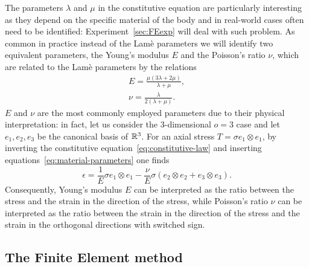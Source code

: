 The parameters $\lambda$ and $\mu$ in the constitutive equation are particularly interesting as they depend on the specific material of the body and in real-world cases often need to be identified: Experiment~\ref{sec:FEexp} will deal with such problem.
As common in practice instead of the Lamè parameters we will identify two equivalent parameters, the Young's modulus $E$ and the Poisson's ratio $\nu$, which are related to the Lamè parameters by the relations
\begin{equation}\label{eq:material-parameters}
    \begin{gathered}
        E = \frac{\mu(3\lambda + 2\mu)}{\lambda + \mu}, \\
        \nu = \frac{\lambda}{2(\lambda + \mu)}.
    \end{gathered}
\end{equation}
$E$ and $\nu$ are the most commonly employed parameters due to their physical interpretation: in fact, let us consider the 3-dimensional $o=3$ case and let $e_1,e_2,e_3$ be the canonical basis of $\mathbb{R}^3$.
For an axial stress $T = \sigma e_1 \otimes e_1$, by inverting the constitutive equation~\eqref{eq:constitutive-law} and inserting equations~\eqref{eq:material-parameters} one finds 
\[
    \epsilon = \frac{1}{E} \sigma e_1 \otimes e_1 - \frac{\nu}{E} \sigma ( e_2 \otimes e_2 + e_3 \otimes e_3).
\]  
Consequently, Young's modulus $E$ can be interpreted as the ratio between the stress and the strain in the direction of the stress, while Poisson's ratio $\nu$ can be interpreted as the ratio between the strain in the direction of the stress and the strain in the orthogonal directions with switched sign.

\subsection{The Finite Element method} \label{sec:AdaFE}

